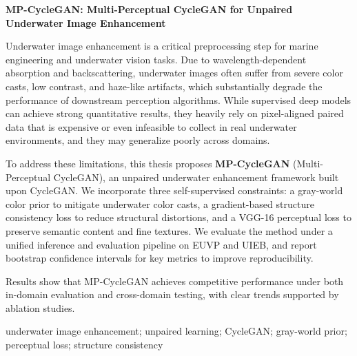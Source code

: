 \documentclass[a4paper,zihao=-4,linespread=1.25]{ctexart}
\begin{document}
\newpage

\begin{center}
    {\bfseries MP-CycleGAN: Multi-Perceptual CycleGAN for Unpaired Underwater Image Enhancement}
\end{center}

\vspace{\baselineskip}

\noindent{}
{
Underwater image enhancement is a critical preprocessing step for marine engineering and underwater vision tasks. Due to wavelength-dependent absorption and backscattering, underwater images often suffer from severe color casts, low contrast, and haze-like artifacts, which substantially degrade the performance of downstream perception algorithms. While supervised deep models can achieve strong quantitative results, they heavily rely on pixel-aligned paired data that is expensive or even infeasible to collect in real underwater environments, and they may generalize poorly across domains.

To address these limitations, this thesis proposes \textbf{MP-CycleGAN} (Multi-Perceptual CycleGAN), an unpaired underwater enhancement framework built upon CycleGAN. We incorporate three self-supervised constraints: a gray-world color prior to mitigate underwater color casts, a gradient-based structure consistency loss to reduce structural distortions, and a VGG-16 perceptual loss to preserve semantic content and fine textures. We evaluate the method under a unified inference and evaluation pipeline on EUVP and UIEB, and report bootstrap confidence intervals for key metrics to improve reproducibility.

Results show that MP-CycleGAN achieves competitive performance under both in-domain evaluation and cross-domain testing, with clear trends supported by ablation studies.
\par}

\vspace{\baselineskip}

\noindent{}
{ underwater image enhancement; unpaired learning; CycleGAN; gray-world prior; perceptual loss; structure consistency}
\end{document}
